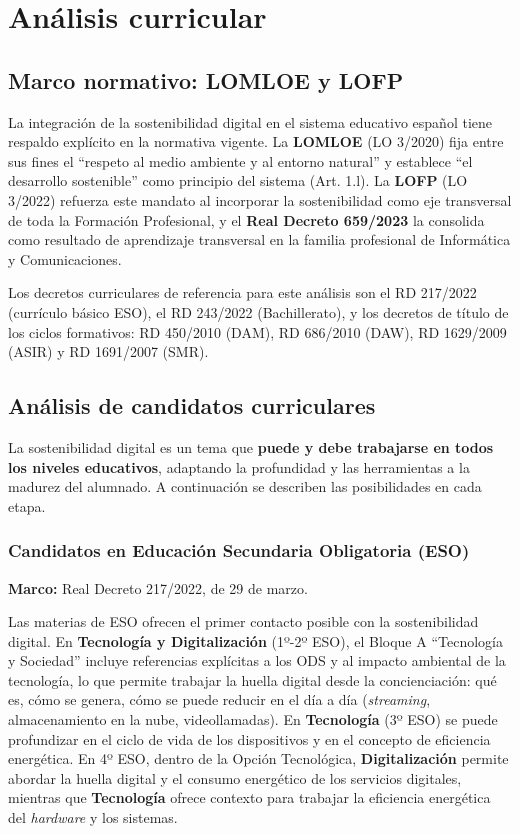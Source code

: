 \chapter{Análisis curricular}
\label{cap:capitulo3}




\section{Marco normativo: LOMLOE y LOFP}


La integración de la sostenibilidad digital en el sistema educativo español tiene respaldo explícito en la normativa vigente. La \textbf{LOMLOE} (LO 3/2020) fija entre sus fines el ``respeto al medio ambiente y al entorno natural'' y establece ``el desarrollo sostenible'' como principio del sistema (Art. 1.l). La \textbf{LOFP} (LO 3/2022) refuerza este mandato al incorporar la sostenibilidad como eje transversal de toda la Formación Profesional, y el \textbf{Real Decreto 659/2023} la consolida como resultado de aprendizaje transversal en la familia profesional de Informática y Comunicaciones.


Los decretos curriculares de referencia para este análisis son el RD 217/2022 (currículo básico ESO), el RD 243/2022 (Bachillerato), y los decretos de título de los ciclos formativos: RD 450/2010 (DAM), RD 686/2010 (DAW), RD 1629/2009 (ASIR) y RD 1691/2007 (SMR).




\section{Análisis de candidatos curriculares}


La sostenibilidad digital es un tema que \textbf{puede y debe trabajarse en todos los niveles educativos}, adaptando la profundidad y las herramientas a la madurez del alumnado. A continuación se describen las posibilidades en cada etapa.


\subsection{Candidatos en Educación Secundaria Obligatoria (ESO)}


\textbf{Marco:} Real Decreto 217/2022, de 29 de marzo.


Las materias de ESO ofrecen el primer contacto posible con la sostenibilidad digital. En \textbf{Tecnología y Digitalización} (1º-2º ESO), el Bloque A ``Tecnología y Sociedad'' incluye referencias explícitas a los ODS y al impacto ambiental de la tecnología, lo que permite trabajar la huella digital desde la concienciación: qué es, cómo se genera, cómo se puede reducir en el día a día (\textit{streaming}, almacenamiento en la nube, videollamadas). En \textbf{Tecnología} (3º ESO) se puede profundizar en el ciclo de vida de los dispositivos y en el concepto de eficiencia energética. En 4º ESO, dentro de la Opción Tecnológica, \textbf{Digitalización} permite abordar la huella digital y el consumo energético de los servicios digitales, mientras que \textbf{Tecnología} ofrece contexto para trabajar la eficiencia energética del \textit{hardware} y los sistemas.


